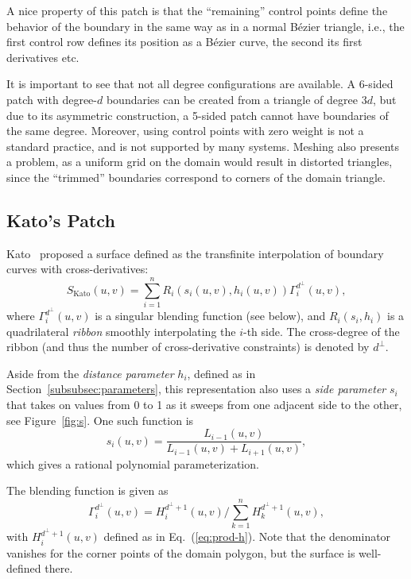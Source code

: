 \documentclass[9pt,academicons]{article}
\begin{document}
A nice property of this patch is that the ``remaining'' control points define the behavior of the
boundary in the same way as in a normal B\'ezier triangle, i.e., the first control row defines
its position as a B\'ezier curve, the second its first derivatives etc.

It is important to see that not all degree configurations are available.
A 6-sided patch with degree-$d$ boundaries can be created from a triangle of degree $3d$,
but due to its asymmetric construction,
a 5-sided patch cannot have boundaries of the same degree. Moreover, using control points with zero
weight is not a standard practice, and is not supported by many systems. Meshing
also presents a problem, as a uniform grid on the domain would result in distorted triangles,
since the ``trimmed'' boundaries correspond to corners of the domain triangle.

\subsection{Kato's Patch}
\label{subsec:kato}
Kato~\cite{Kato:1991} proposed a surface defined as the transfinite interpolation of boundary
curves with cross-derivatives:
\begin{equation}
  S_\mathrm{Kato}(u,v)=\sum_{i=1}^nR_i(s_i(u,v),h_i(u,v))\Gamma_i^{d^\perp}(u,v),
\end{equation}
where $\Gamma_i^{d^\perp}(u,v)$ is a singular blending function (see below), and
$R_i(s_i,h_i)$ is a quadrilateral \emph{ribbon} smoothly interpolating the $i$-th side.
The cross-degree of the ribbon
(and thus the number of cross-derivative constraints) is denoted by $d^\perp$.

Aside from the \emph{distance parameter} $h_i$, defined as in Section~\ref{subsubsec:parameters},
this representation also uses a \emph{side parameter} $s_i$
that takes on values from 0 to 1 as it sweeps from one adjacent side to the other,
see Figure~\ref{fig:s}.
One such function is
\begin{equation}
  s_i(u,v)=\frac{L_{i-1}(u,v)}{L_{i-1}(u,v)+L_{i+1}(u,v)},
\end{equation}
which gives a rational polynomial parameterization.

The blending function is given as
\begin{equation}
  \Gamma_i^{d^\perp}(u,v)=H_i^{d^\perp+1}(u,v)\big/\sum_{k=1}^nH_k^{d^\perp+1}(u,v),
\end{equation}
with $H_i^{d^\perp+1}(u,v)$ defined as in Eq.~(\ref{eq:prod-h}).
Note that the denominator vanishes for the corner points of the domain polygon,
but the surface is well-defined there.
\end{document}
